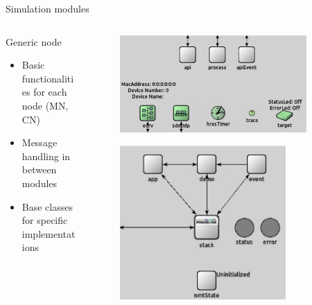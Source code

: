\begin{frame}{Simulation modules}
\begin{columns}
\begin{column}{0.5\textwidth}
            \begin{block}{Generic node}
                \begin{itemize}
                    \item Basic functionalities for each node (MN, CN)
                    \item Message handling in between modules
                    \item Base classes for specific implementations
                \end{itemize}
            \end{block}
        \end{column}
        \begin{column}{0.5\textwidth}
            \begin{figure}
                \vspace{-1cm}
                \includegraphics[width=0.9\textwidth]{../../thesis/images/simulation_stack_module.eps}
            \end{figure}
            \begin{figure}
                \vspace{-0.5cm}
                \includegraphics[width=0.8\textwidth]{../../thesis/images/simulation_genericnode.eps}
            \end{figure}
        \end{column}
    \end{columns}
\end{frame}

